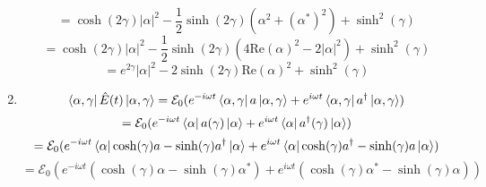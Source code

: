 \begin{sol}
\begin{enumerate}[label=\textbf{(\alph*)}]
$$=\cosh(2\gamma)|\alpha|^2-\frac{1}{2}\sinh(2\gamma)(\alpha^2+(\alpha^*)^2)+\sinh^2(\gamma)$$
$$=\cosh(2\gamma)|\alpha|^2-\frac{1}{2}\sinh(2\gamma)(4\text{Re}(\alpha)^2-2|\alpha|^2)+\sinh^2(\gamma)$$
$$=e^{2\gamma}|\alpha|^2-2\sinh(2\gamma)\text{Re}(\alpha)^2+\sinh^2(\gamma)$$
\item
$$\bra{\alpha,\gamma}\hat E(t)\ket{\alpha,\gamma}=\mathcal{E}_0(e^{-i\omega t}\bra{\alpha,\gamma}a\ket{\alpha,\gamma}+e^{i\omega t}\bra{\alpha,\gamma}a^\dagger\ket{\alpha,\gamma})$$ 
$$=\mathcal{E}_0(e^{-i\omega t}\bra{\alpha}a(\gamma)\ket\alpha+e^{i\omega t}\bra\alpha a^\dagger(\gamma)\ket\alpha)$$
$$=\mathcal{E}_0(e^{-i\omega t}\bra{\alpha}\cosh(\gamma)a-\sinh(\gamma)a^\dagger\ket\alpha+e^{i\omega t}\bra\alpha\cosh(\gamma)a^\dagger-\sinh(\gamma)a\ket\alpha)$$
$$=\mathcal E_0(e^{-i\omega t}(\cosh(\gamma)\alpha-\sinh(\gamma)\alpha^*)+e^{i\omega t}(\cosh(\gamma)\alpha^*-\sinh(\gamma)\alpha))$$ 
\end{enumerate}
\end{sol}